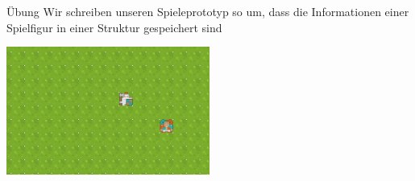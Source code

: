 \documentclass[presentation]{beamer}
\begin{document}
\begin{frame}[label={sec:org6ef4b3b}]{Übung}
Wir schreiben unseren Spieleprototyp so um, dass die Informationen
einer Spielfigur in einer Struktur gespeichert sind
\begin{center}\begin{center}
\includegraphics[width=0.5\textwidth]{data/06/33dede-9a84-458e-8ea0-5ae29bb9bc9c/screenshot-20200306-160024.png}
\end{center}\end{center}
\end{frame}
\end{document}
